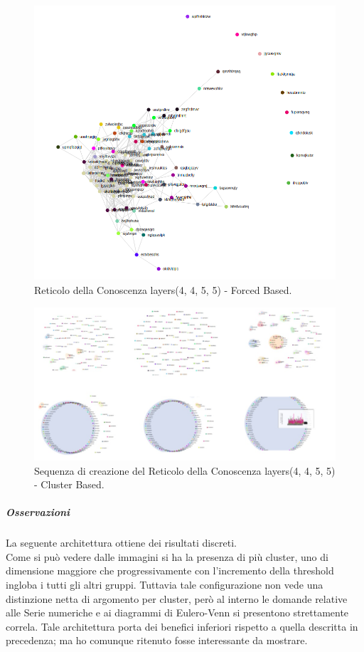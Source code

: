 \begin{figure}[H]
\centering
	\includegraphics[width=0.70\linewidth]{./image/logica(4,4,5,5)_forced.png}
	\caption{Reticolo della Conoscenza layers(4, 4, 5, 5) - Forced Based.}
	\label{Reticolo della Conoscenza layers(4, 4, 5, 5) - Forced Based.}
\end{figure}
\noindent
\begin{figure}[H]
\centering
	\includegraphics[width=0.70\linewidth]{./image/collage_reticolo-logica(4,4,5,5).png}
	\caption{Sequenza di creazione del Reticolo della Conoscenza layers(4, 4, 5, 5) - Cluster Based.}
	\label{Sequenza di creazione del Reticolo della Conoscenza layers(4, 4, 5, 5) - Cluster Based.}
\end{figure}
\noindent
\subparagraph{Osservazioni}\mbox{}
\noindent
La seguente architettura ottiene dei risultati discreti.\\
Come si può vedere dalle immagini si ha la presenza di più cluster, uno di dimensione maggiore che progressivamente con l'incremento della threshold ingloba i tutti gli altri gruppi. Tuttavia tale configurazione non vede una distinzione netta di argomento per cluster, però al interno le domande relative alle Serie numeriche e ai diagrammi di Eulero-Venn si presentono strettamente correla. Tale architettura porta dei benefici inferiori rispetto a quella descritta in precedenza; ma ho comunque ritenuto fosse interessante da mostrare.
